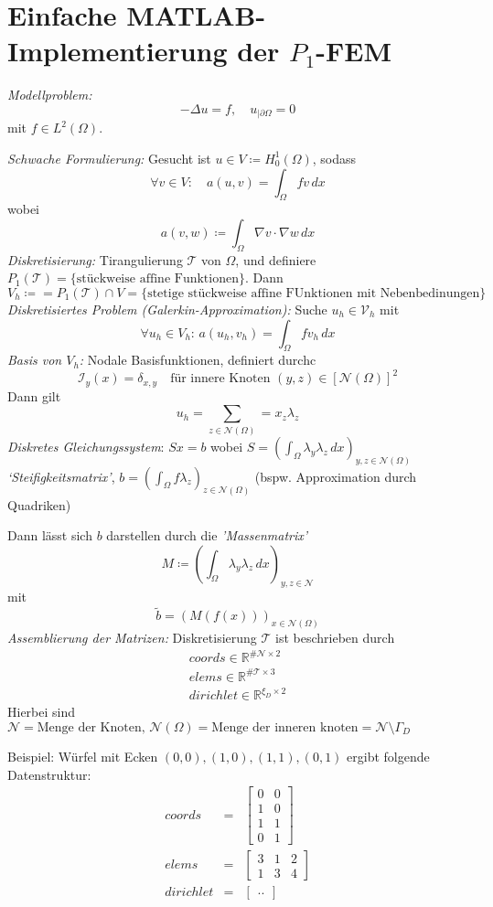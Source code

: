 \documentclass[a4paper]{amsart}
\begin{document}
\section*{Einfache MATLAB-Implementierung der $P_1$-FEM}

\emph{Modellproblem:}
\[
	-\Delta u = f,\quad u_{|\partial\Omega} = 0
\]
mit $f\in L^2(\Omega)$.\par
\emph{Schwache Formulierung:} Gesucht ist $u\in V \coloneqq H^1_0(\Omega)$, sodass
\[
	\forall v\in V:\quad a(u,v) = \int_\Omega fv\,dx
\]
wobei
\[
	a(v,w) \coloneqq \int_\Omega\nabla v\cdot\nabla w\,dx
\]
\emph{Diskretisierung:} Tirangulierung $\mathcal{T}$ von $\Omega$, und definiere $P_1(\mathcal{T}) = \{\text{stückweise affine Funktionen}\}$. Dann
\[
	V_h \coloneqq = P_1(\mathcal{T})\cap V = \{\text{stetige stückweise affine FUnktionen mit Nebenbedinungen}\}
\]
\emph{Diskretisiertes Problem (Galerkin-Approximation):} Suche $u_h\in\mathcal{V}_h$ mit 
\[
	\forall u_h\in V_h:\,a(u_h,v_h) = \int_\Omega f v_h\, dx
\]
\emph{Basis von $V_h$:} Nodale Basisfunktionen, definiert durchc
\[
	\mathcal{I}_y(x) = \delta_{x,y}\quad\text{für innere Knoten }(y,z)\in\left[\mathcal{N}(\Omega)\right]^2
\]
Dann gilt
\[
	u_h = \sum_{z\in\mathcal{N}(\Omega)} = x_z\lambda_z
\]
\emph{Diskretes Gleichungssystem}: $Sx = b$ wobei $S = \left(\int_\Omega \lambda_y\lambda_z\, dx\right)_{y,z\in\mathcal{N}(\Omega)}$ \emph{`Steifigkeitsmatrix'}, $b=\left(\int_\Omega f\lambda_z\right)_{z\in\mathcal{N}(\Omega)}$ (bspw. Approximation durch Quadriken)\par
Dann lässt sich $b$ darstellen durch die \emph{'Massenmatrix'} 
\[
	M\coloneqq \left(\int_\Omega \lambda_y\lambda_z\,dx\right)_{y,z\in\mathcal{N}}
\]
mit 
\[
	\tilde{b} = \left( M(f(x)) \right)_{x\in\mathcal{N}(\Omega)}
\]
\emph{Assemblierung der Matrizen:} Diskretisierung $\mathcal{T}$ ist beschrieben durch
\begin{eqnarray*}
	coords\in\mathbb{R}^{\# \mathcal{N}\times 2}\\
	elems\in\mathbb{R}^{\#\mathcal{T}\times 3}\\
	dirichlet\in\mathbb{R}^{\xi_D\times 2}
\end{eqnarray*}
Hierbei sind $\mathcal{N} = \text{Menge der Knoten},\,\mathcal{N}(\Omega) = \text{Menge der inneren knoten} = \mathcal{N}\setminus\Gamma_D$

Beispiel: Würfel mit Ecken $(0,0),(1,0),(1,1),(0,1)$ ergibt folgende Datenstruktur:
\begin{eqnarray*}
	coords &=& \begin{bmatrix} 0 & 0\\ 1 & 0 \\ 1 & 1 \\ 0 & 1\end{bmatrix} \\
	elems &=& \begin{bmatrix}3&1&2\\1&3&4\end{bmatrix}\\
	dirichlet &=& \begin{bmatrix}..\end{bmatrix} %
\end{eqnarray*}
\end{document}
